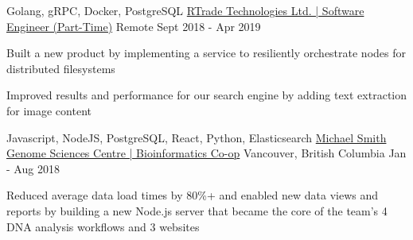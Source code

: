 \begin{cventries}
  \cventry
    {Golang, gRPC, Docker, PostgreSQL} %
    {\href{https://bobheadxi.dev/experience/rtrade}{RTrade Technologies Ltd. | Software Engineer (Part-Time)}} %
    {Remote} %
    {Sept 2018 - Apr 2019} %
    {
      \begin{cvitems} %
        \item {Built a new product by implementing a service to resiliently orchestrate nodes for distributed filesystems}
        \item {Improved results and performance for our search engine by adding text extraction for image content}
      \end{cvitems}
    }

  \cventry
    {Javascript, NodeJS, PostgreSQL, React, Python, Elasticsearch} %
    {\href{https://bobheadxi.dev/experience/bcgsc}{Michael Smith Genome Sciences Centre | Bioinformatics Co-op}} %
    {Vancouver, British Columbia} %
    {Jan - Aug 2018} %
    {
      \begin{cvitems} %
        \item {Reduced average data load times by 80\%+ and enabled new data views and reports by building a new Node.js server that became the core of the team’s 4 DNA analysis workflows and 3 websites}
      \end{cvitems}
    }

\end{cventries}
